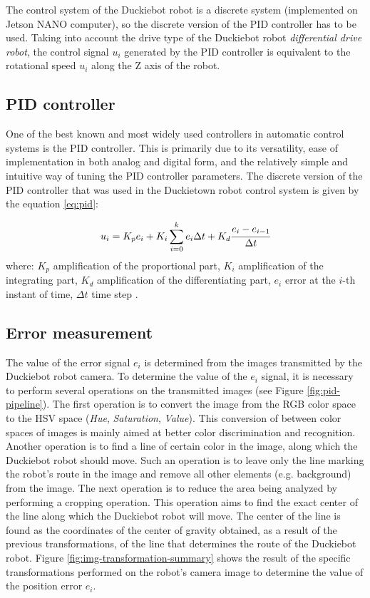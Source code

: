 \documentclass[conference]{IEEEtran}
\begin{document}
The control system of the Duckiebot robot is a discrete system (implemented on Jetson NANO computer), so the discrete version of the PID controller has to be used. Taking into account the drive type of the Duckiebot robot \emph{differential drive robot}, the control signal $u_i$ generated by the PID controller is equivalent to the rotational speed $u_i$ along the Z axis of the robot.

\subsection{PID controller}
One of the best known and most widely used controllers in automatic control systems is the PID controller. This is primarily due to its versatility, ease of implementation in both analog and digital form, and the relatively simple and intuitive way of tuning the PID controller parameters. The discrete version of the PID controller that was used in the Duckietown robot control system is given by the equation \eqref{eq:pid}:

\begin{equation}
u_i = K_p e_i + K_i \sum_{i=0}^k{e_i \Delta t} + K_d \cfrac{e_i-e_{i-1}}{\Delta t}
\label{eq:pid}
\end{equation}
where: $K_p$ amplification of the proportional part, $K_i$ amplification of the integrating part, $K_d$ amplification of the differentiating part, $e_i$ error at the $i$-th instant of time, $\Delta t$ time step \cite{aastrom2021feedback}.

\subsection{Error measurement}
The value of the error signal $e_i$ is determined from the images transmitted by the Duckiebot robot camera. To determine the value of the $e_i$ signal, it is necessary to perform several operations on the transmitted images (see Figure \ref{fig:pid-pipeline}). 
The first operation is to convert the image from the RGB color space to the HSV space (\emph{Hue}, \emph{Saturation}, \emph{Value}). This conversion of between color spaces of images is mainly aimed at better color discrimination and recognition.
Another operation is to find a line of certain color in the image, along which the Duckiebot robot should move. Such an operation is to leave only the line marking the robot's route in the image and remove all other elements (e.g. background) from the image. 
The next operation is to reduce the area being analyzed by performing a cropping operation. This operation aims to find the exact center of the line along which the Duckiebot robot will move. 
The center of the line is found as the coordinates of the center of gravity obtained, as a result of the previous transformations, of the line that determines the route of the Duckiebot robot. Figure \ref{fig:img-transformation-summary} shows the result of the specific transformations performed on the robot's camera image to determine the value of the position error $e_i$.
\end{document}
